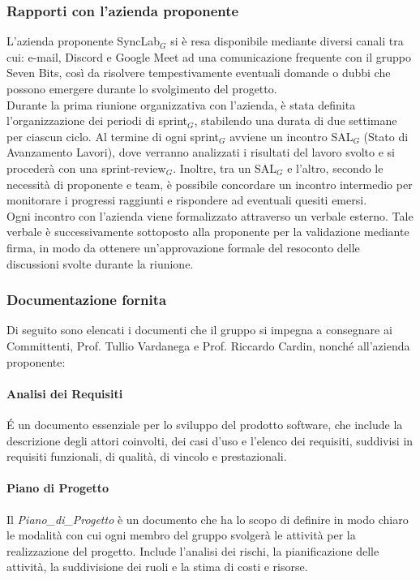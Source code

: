 \documentclass[10pt]{article}
\begin{document}
\begin{justify}
    \subsubsection{Rapporti con l'azienda proponente}
    L'azienda proponente SyncLab$_G$ si è resa disponibile mediante diversi canali tra cui: e-mail, Discord e Google Meet ad una comunicazione frequente con il gruppo Seven Bits, così da risolvere tempestivamente eventuali domande o dubbi che possono emergere durante lo svolgimento del progetto.\\
    Durante la prima riunione organizzativa con l'azienda, è stata definita l'organizzazione dei periodi di sprint$_G$, stabilendo una durata di due settimane per ciascun ciclo. Al termine di ogni sprint$_G$ avviene un incontro SAL$_G$ (Stato di Avanzamento Lavori), dove verranno analizzati i risultati del lavoro svolto e si procederà con una sprint-review$_G$. Inoltre, tra un SAL$_G$ e l'altro, secondo le necessità di proponente e team, è possibile concordare un incontro intermedio per monitorare i progressi raggiunti e rispondere ad eventuali quesiti emersi.\\
    Ogni incontro con l'azienda viene formalizzato attraverso un verbale esterno. Tale verbale è successivamente sottoposto alla proponente per la validazione mediante firma, in modo da ottenere un'approvazione formale del resoconto delle discussioni svolte durante la riunione.\\

    \subsubsection{Documentazione fornita}
    Di seguito sono elencati i documenti che il gruppo si impegna a consegnare ai Committenti, Prof. Tullio Vardanega e Prof. Riccardo Cardin, nonché all'azienda proponente:\\

        \paragraph{Analisi dei Requisiti}
        \'E un documento essenziale per lo sviluppo del prodotto software, che include la descrizione degli attori coinvolti, dei casi d'uso e l'elenco dei requisiti, suddivisi in requisiti funzionali, di qualità, di vincolo e prestazionali.\\

        \paragraph{Piano di Progetto}
        Il \textit{Piano\_di\_Progetto} è un documento che ha lo scopo di definire in modo chiaro le modalità con cui ogni membro del gruppo svolgerà le attività per la realizzazione del progetto. Include l'analisi dei rischi, la pianificazione delle attività, la suddivisione dei ruoli e la stima di costi e risorse.\\


\end{justify}
\end{document}
